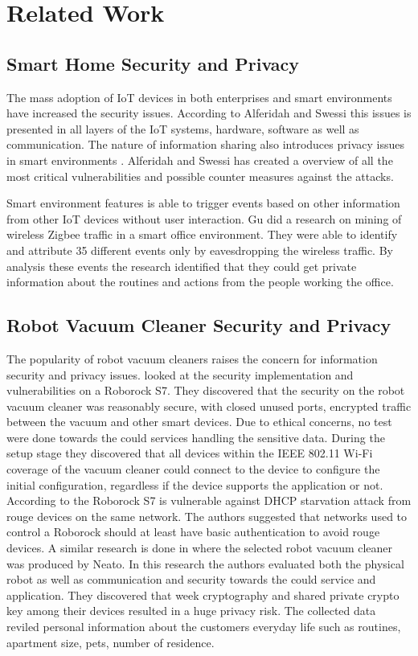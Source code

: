 \chapter{Related Work}



\section{Smart Home Security and Privacy}
The mass adoption of IoT devices in both enterprises and smart environments have increased the security issues. According to Alferidah \cite{Iotissues} and Swessi \cite{iotissues1} this issues is presented in all layers of the IoT systems, hardware, software as well as communication. The nature of information sharing also introduces privacy issues in smart environments \cite{Iotissues}. Alferidah \cite{Iotissues} and Swessi \cite{iotissues1} has created a overview of all the most critical vulnerabilities and possible counter measures against the attacks. 

Smart environment features is able to trigger events based on other information from other IoT devices without user interaction. Gu \cite{eavsIoT} did a research on mining of wireless Zigbee traffic in a smart office environment. They were able to identify and attribute 35 different events only by eavesdropping the wireless traffic. By analysis these events the research identified that they could get private information about the routines and actions from the people working the office. 

\section{Robot Vacuum Cleaner Security and Privacy}
The popularity of robot vacuum cleaners raises the concern for information security and privacy issues.   \cite{Roborockvulnerability} looked at the security implementation and vulnerabilities on a Roborock S7. They discovered that the security on the robot vacuum cleaner was reasonably secure, with closed unused ports, encrypted traffic between the vacuum and other smart devices. Due to ethical concerns, no test were done towards the could services handling the sensitive data. During the setup stage they discovered that all devices within the IEEE 802.11 Wi-Fi coverage of the vacuum cleaner could connect to the device to configure the initial configuration, regardless if the device supports the application or not. According to \cite{Roborockvulnerability} the Roborock S7 is vulnerable against DHCP starvation attack from rouge devices on the same network. The authors suggested that networks used to control a Roborock should at least have basic authentication to avoid rouge devices. 
A similar research is done in \cite{Neato} where the selected robot vacuum cleaner was produced by Neato. In this research the authors evaluated both the physical robot as well as communication and security towards the could service and application. They discovered that week cryptography and shared private crypto key among their devices resulted in a huge privacy risk. The collected data reviled personal information about the customers everyday life such as routines, apartment size, pets, number of residence. 

